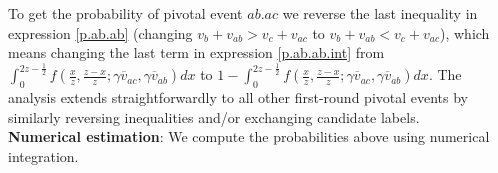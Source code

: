 \documentclass[11pt,a4paper]{article}
\begin{document}
To get the probability of pivotal event $ab.ac$ we reverse the last inequality in expression \ref{p.ab.ab} (changing $v_b + v_{ab} > v_c + v_{ac}$ to $v_b + v_{ab} < v_c + v_{ac}$), which means changing the last term in expression \ref{p.ab.ab.int} from $\int_0^{2z - \frac{1}{2}} f\left( \frac{x}{z}, \frac{z - x}{z}; \gamma \overline{v}_{ac}, \gamma \overline{v}_{ab} \right)  dx$ to $1 - \int_0^{2z - \frac{1}{2}} f\left( \frac{x}{z}, \frac{z - x}{z}; \gamma \overline{v}_{ac}, \gamma \overline{v}_{ab} \right)  dx$. The analysis extends straightforwardly to all other first-round pivotal events by similarly reversing inequalities and/or exchanging candidate labels.\\


\noindent \textbf{Numerical estimation}: We compute the probabilities above using numerical integration. \\   
   
\end{document}
